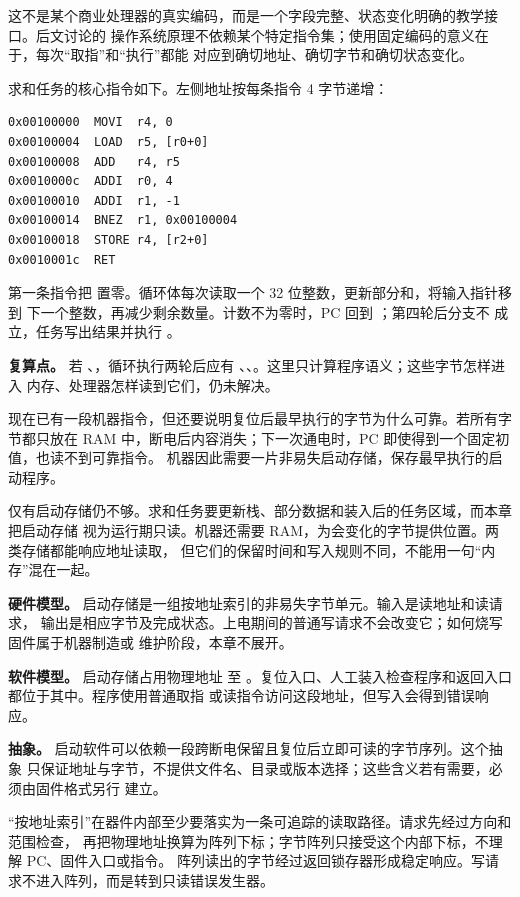 这不是某个商业处理器的真实编码，而是一个字段完整、状态变化明确的教学接口。后文讨论的
操作系统原理不依赖某个特定指令集；使用固定编码的意义在于，每次“取指”和“执行”都能
对应到确切地址、确切字节和确切状态变化。

求和任务的核心指令如下。左侧地址按每条指令 4 字节递增：

\begin{lstlisting}
0x00100000  MOVI  r4, 0
0x00100004  LOAD  r5, [r0+0]
0x00100008  ADD   r4, r5
0x0010000c  ADDI  r0, 4
0x00100010  ADDI  r1, -1
0x00100014  BNEZ  r1, 0x00100004
0x00100018  STORE r4, [r2+0]
0x0010001c  RET
\end{lstlisting}

第一条指令把  置零。循环体每次读取一个 32 位整数，更新部分和，将输入指针移到
下一个整数，再减少剩余数量。计数不为零时，PC 回到 ；第四轮后分支不
成立，任务写出结果并执行 。

\begin{problemframe}
\textbf{复算点。} 若 、，循环执行两轮后应有
、、。这里只计算程序语义；这些字节怎样进入
内存、处理器怎样读到它们，仍未解决。
\end{problemframe}


现在已有一段机器指令，但还要说明复位后最早执行的字节为什么可靠。若所有字节都只放在
RAM 中，断电后内容消失；下一次通电时，PC 即使得到一个固定初值，也读不到可靠指令。
机器因此需要一片非易失启动存储，保存最早执行的启动程序。

仅有启动存储仍不够。求和任务要更新栈、部分数据和装入后的任务区域，而本章把启动存储
视为运行期只读。机器还需要 RAM，为会变化的字节提供位置。两类存储都能响应地址读取，
但它们的保留时间和写入规则不同，不能用一句“内存”混在一起。


\textbf{硬件模型。} 启动存储是一组按地址索引的非易失字节单元。输入是读地址和读请求，
输出是相应字节及完成状态。上电期间的普通写请求不会改变它；如何烧写固件属于机器制造或
维护阶段，本章不展开。

\textbf{软件模型。} 启动存储占用物理地址  至
。复位入口、人工装入检查程序和返回入口都位于其中。程序使用普通取指
或读指令访问这段地址，但写入会得到错误响应。

\textbf{抽象。} 启动软件可以依赖一段跨断电保留且复位后立即可读的字节序列。这个抽象
只保证地址与字节，不提供文件名、目录或版本选择；这些含义若有需要，必须由固件格式另行
建立。

“按地址索引”在器件内部至少要落实为一条可追踪的读取路径。请求先经过方向和范围检查，
再把物理地址换算为阵列下标；字节阵列只接受这个内部下标，不理解 PC、固件入口或指令。
阵列读出的字节经过返回锁存器形成稳定响应。写请求不进入阵列，而是转到只读错误发生器。

